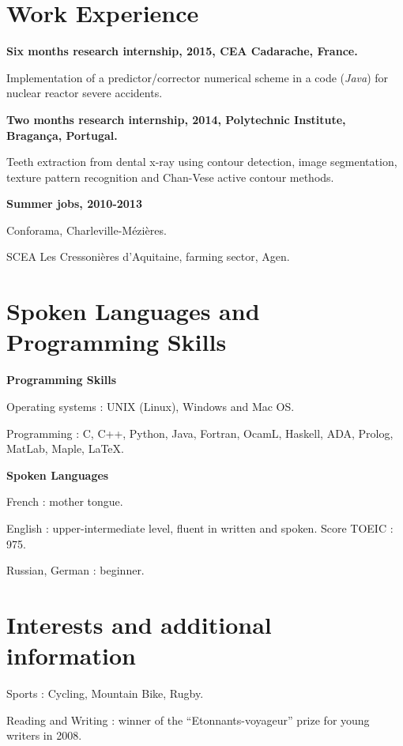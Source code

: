\documentclass{article}
\renewenvironment{itemize}{
  \begin{list}{}{
      \setlength{\leftmargin}{1.5em}
      \setlength{\itemsep}{0.25em}
      \setlength{\parskip}{0pt}
      \setlength{\parsep}{0.25em}
    }
}{
  \end{list}
}
\begin{document}
\section*{Work Experience}
\begin{itemize}
	\item \textbf{Six months research internship, 2015, CEA Cadarache, France.}
		\begin{itemize}
			\item Implementation of a predictor/corrector numerical scheme in a code (\textit{Java}) for nuclear reactor severe accidents.
		\end{itemize}
	\item \textbf{Two months research internship, 2014, Polytechnic Institute, Bragança, Portugal.}
		\begin{itemize}
			\item Teeth extraction from dental x-ray using contour detection, image segmentation, texture pattern recognition and Chan-Vese active contour methods.
		\end{itemize}
	\item \textbf{Summer jobs, 2010-2013}
		\begin{itemize}
			\item Conforama, Charleville-Mézières.
			\item SCEA Les Cressonières d'Aquitaine, farming sector, Agen.
		\end{itemize}
\end{itemize}  

\section*{Spoken Languages and Programming Skills}
\begin{itemize}
	\item \textbf{Programming Skills}
		\begin{itemize}
			\item Operating systems : UNIX (Linux), Windows and Mac OS.
			\item Programming : C, C++, Python, Java, Fortran, OcamL, Haskell, ADA, Prolog, MatLab, Maple, \LaTeX. 
		\end{itemize}
	\item \textbf{Spoken Languages}
		\begin{itemize}
			\item French : mother tongue.
			\item English : upper-intermediate level, fluent in written and spoken. Score TOEIC : 975.
			\item Russian, German : beginner.
		\end{itemize}
\end{itemize}  

\section*{Interests and additional information}
\begin{itemize}
	\item Sports : Cycling, Mountain Bike, Rugby.
	\item Reading and Writing : winner of the ``Etonnants-voyageur'' prize for young writers in 2008.
\end{itemize}  
\end{document}
